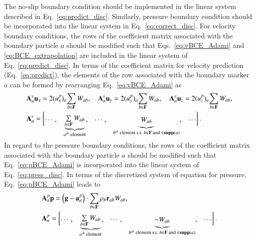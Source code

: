 \documentclass[final,3p,times]{elsarticle}
\begin{document}
The no-slip boundary condition should be implemented in the linear system described in Eq.~\eqref{eq:predict_disc}. Similarly, pressure boundary condition should be incorporated into the linear system in Eq.~\eqref{eq:correct_disc}. For velocity boundary conditions, the rows of the coefficient matrix associated with the boundary particle $a$ should be modified such that Eqs.~\eqref{eq:vBCE_Adami} and \eqref{eq:BCE_extrapolation} are included in the linear system of Eq.~\eqref{eq:predict_disc}. In terms of the coefficient matrix for velocity prediction (Eq.~\eqref{eq:predict}), the elements of the row associated with the boundary marker $a$ can be formed by rearranging Eq.~\eqref{eq:vBCE_Adami} as
\begin{align}\renewcommand{\arraystretch}{1.2}
&\mathbf{A}^{v}_a \mathbf{u}_x=  2 ({u}_x^{p})_a {\sum\limits_{b \in \mathbf{F}} {W_{ab}}},
\quad
\mathbf{A}^{v}_a \mathbf{u}_y=  2 ({u}_y^{p})_a {\sum\limits_{b \in \mathbf{F}} {W_{ab}}}, 
\quad
\mathbf{A}^{v}_a \mathbf{u}_z=  2 ({u}_z^{p})_a {\sum\limits_{b \in \mathbf{F}} {W_{ab}}},  \\
&\mathbf{A}^{v}_a= \begin{bmatrix}
\cdots, & 
\smash[b]{\underbrace{\begin{matrix}{\sum\limits_{b \in \mathbf{F}} {W_{ab}}} \end{matrix}}_{a^{th}\text{ element}}} ,
&\cdots, &\smash[b]{\underbrace{\begin{matrix} {W_{ab}}\end{matrix}}_{b^{th}\text{ element s.t. }{b \in \mathbf{F} \text{ and } \in \support{a}} }}, & \cdots
\end{bmatrix} \label{eq:U_BC}.
\end{align}
\\
In regard to the pressure boundary conditions, the rows of the coefficient matrix associated with the boundary particle $a$ should be modified such that Eq.~\eqref{eq:pBCE_Adami} is incorporated into the linear system of Eq.~\eqref{eq:press_disc}. In terms of the discretized system of equation for pressure, Eq.~\eqref{eq:pBCE_Adami} leads to
\begin{align}\renewcommand{\arraystretch}{1.2}
&\mathbf{A}^{p}_a \mathbf{p}= \left( \mathbf{g} - \mathbf{a}_a^p \right) \cdot \sum\limits_{b \in \bf F} {\rho_b \mathbf{r}_{ab} W_{ab} },\\
&\mathbf{A}^{p}_a= \begin{bmatrix}
\cdots, & 
\smash[b]{\underbrace{\begin{matrix}{\sum\limits_{b \in \mathbf{F}} {W_{ab}}} \end{matrix}}_{a^{th}\text{ element}}} ,
&\cdots, &\smash[b]{\underbrace{\begin{matrix} {-W_{ab}}\end{matrix}}_{b^{th}\text{ element s.t. }{b \in \mathbf{F} \text{ and } \in \support{a}} }}, & \cdots
\end{bmatrix} \label{eq:p_BC}.
\end{align}
\end{document}
